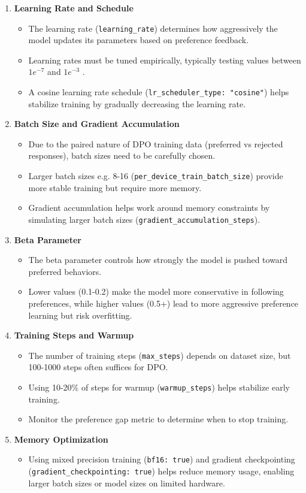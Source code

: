 \begin{enumerate}
\item \textbf{Learning Rate and Schedule}
\begin{itemize}
\item The learning rate (\texttt{learning\_rate}) determines how aggressively the model updates its parameters based on preference feedback. 
\item Learning rates must be tuned empirically, typically testing values between $1e^{-7}$ and $1e^{-3}$ .
\item A cosine learning rate schedule (\texttt{lr\_scheduler\_type: "cosine"}) helps stabilize training by gradually decreasing the learning rate.
\end{itemize}

\item \textbf{Batch Size and Gradient Accumulation}
\begin{itemize}
\item Due to the paired nature of DPO training data (preferred vs rejected responses), batch sizes need to be carefully chosen. 
\item Larger batch sizes e.g. 8-16 (\texttt{per\_device\_train\_batch\_size}) provide more stable training but require more memory. 
\item Gradient accumulation helps work around memory constraints by simulating larger batch sizes (\texttt{gradient\_accumulation\_steps}).
\end{itemize}

\item \textbf{Beta Parameter}
\begin{itemize}
\item The beta parameter controls how strongly the model is pushed toward preferred behaviors. 
\item Lower values (0.1-0.2) make the model more conservative in following preferences, while higher values (0.5+) lead to more aggressive preference learning but risk overfitting.
\end{itemize}

\item \textbf{Training Steps and Warmup}
\begin{itemize}
\item The number of training steps (\texttt{max\_steps}) depends on dataset size, but 100-1000 steps often suffices for DPO. 
\item Using 10-20\% of steps for warmup (\texttt{warmup\_steps}) helps stabilize early training. 
\item Monitor the preference gap metric to determine when to stop training.
\end{itemize}

\item \textbf{Memory Optimization}
\begin{itemize}
\item Using mixed precision training (\texttt{bf16: true}) and gradient checkpointing (\texttt{gradient\_checkpointing: true}) helps reduce memory usage, enabling larger batch sizes or model sizes on limited hardware.
\end{itemize}
\end{enumerate}

